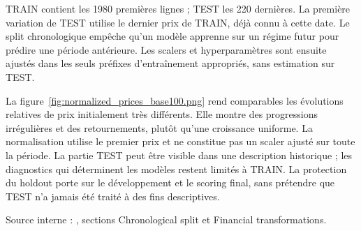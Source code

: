 TRAIN contient les 1980 premières lignes ; TEST les 220 dernières. La première variation de TEST utilise le dernier prix de TRAIN, déjà connu à cette date. Le split chronologique empêche qu’un modèle apprenne sur un régime futur pour prédire une période antérieure. Les scalers et hyperparamètres sont ensuite ajustés dans les seuls préfixes d’entraînement appropriés, sans estimation sur TEST.






La figure~\ref{fig:normalized_prices_base100.png} rend comparables les évolutions relatives de prix initialement très différents. Elle montre des progressions irrégulières et des retournements, plutôt qu’une croissance uniforme. La normalisation utilise le premier prix et ne constitue pas un scaler ajusté sur toute la période. La partie TEST peut être visible dans une description historique ; les diagnostics qui déterminent les modèles restent limités à TRAIN. La protection du holdout porte sur le développement et le scoring final, sans prétendre que TEST n’a jamais été traité à des fins descriptives.



Source interne : , sections Chronological split et Financial transformations.
